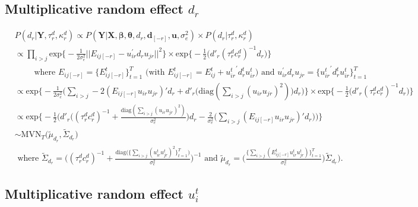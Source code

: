 \documentclass[a4paper]{article}
\begin{document}
\subsection{Multiplicative random effect $d_r$}\label{d}
	\begin{equation}
	\begin{aligned}
	&P(d_r|\mathbf{Y}, \tau_r^d, \kappa_r^d) \propto P(\mathbf{Y}|\mathbf{X}, \boldsymbol{\beta}, \boldsymbol{\theta}, d_r, \boldsymbol{d}_{[-r]}, \boldsymbol{u},\sigma_e^2) \times P(d_r| \tau_r^d, \kappa_r^d) \\
	&\propto\prod\limits_{i>j}\mbox{exp}\Big\{-\frac{1}{2\sigma_e^2}||E_{ij[-r]}-u_{ir}^\prime d_ru_{jr}||^2\Big\}\times \mbox{exp}\Big\{-\frac{1}{2}\big(d'_r(\tau_r^dc_r^d)^{-1}d_r\big)\Big\}\\ &\quad\quad\mbox{ where } E_{ij[-r]} = \{E^t_{ij[-r]}\}_{t=1}^T \mbox{ (with }E^{t}_{ij[-r]}=E^t_{ij}+{u^t_{ir}}^\prime d_r^t u^t_{ir})\mbox{ and } u_{ir}^\prime d_ru_{jr} = \{{u^t_{ir}}^\prime d_r^t u^t_{ir}\}_{t=1}^T\\
	&\propto\mbox{exp}\Big\{-\frac{1}{2\sigma_e^2}\Big(\sum\limits_{i>j}-2(E_{ij[-r]}u_{ir}u_{jr})'d_r+d'_r\big(\mbox{diag}(\sum\limits_{i>j}({u_{ir}u_{jr}})^2)\big)d_r\Big)\Big\}\times \mbox{exp}\Big\{-\frac{1}{2}\big(d'_r(\tau_r^dc_r^d)^{-1}d_r\big)\Big\}\\
	&\propto\mbox{exp}\Big\{-\frac{1}{2}\Big(d'_r\big((\tau_r^dc_r^d)^{-1}+\frac{\mbox{diag}(\sum_{i>j}({u_{ir}u_{jr}})^2)}{\sigma_e^2}\big)d_r-\frac{2}{\sigma_e^2}\big(\sum_{i>j}(E_{ij[-r]}u_{ir}u_{jr})'d_r\big)\Big)\Big\}\\
	& \sim \mbox{MVN}_T\big(\tilde{\mu}_{d_r}, \tilde{\Sigma}_{d_r} \big)\\
	& \mbox{ where }\tilde{\Sigma}_{d_r} = \Big((\tau_r^d{c_r^d})^{-1}+\frac{\mbox{diag}\big(\{\sum_{i>j}({u^t_{ir}u^t_{jr}})^2\}_{t=1}^{T}\big)}{\sigma_e^2}\Big)^{-1} \mbox{ and } \tilde{\mu}_{d_r} =  \Big(\frac{\{\sum_{i>j}(E^{t}_{ij[-r]}u^t_{ir}u^t_{jr})\}_{t=1}^{T}}{\sigma_e^2}\Big)\tilde{\Sigma}_{d_r}).
	\end{aligned}
	\end{equation} 

\subsection{Multiplicative random effect $u^t_i$}\label{u}
\end{document}
